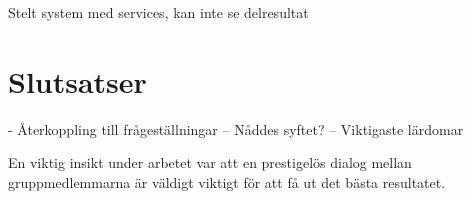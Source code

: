 Stelt system med services, kan inte se delresultat


\section{Slutsatser}
\label{sec:conclusions-lundberg}

- Återkoppling till frågeställningar
– Nåddes syftet?
– Viktigaste lärdomar

En viktig insikt under arbetet var att en prestigelös dialog mellan gruppmedlemmarna är väldigt viktigt för att få ut det bästa resultatet.

